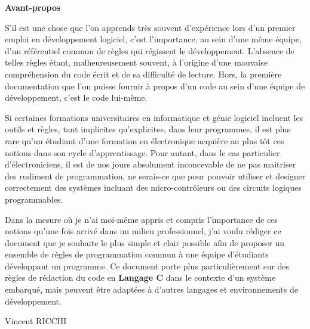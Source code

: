 \thispagestyle{empty}

\begin{Huge}
\textbf{Avant-propos}
\end{Huge}
\bigskip

S'il est une chose que l'on apprends très souvent d'expérience lors d'un premier emploi en développement logiciel, c'est l'importance, au sein d'une même équipe, d'un référentiel commun de règles qui régissent le développement. L'absence de telles règles étant, malheureusement souvent, à l'origine d'une mauvaise compréhension du code écrit et de sa difficulté de lecture. Hors, la première documentation que l'on puisse fournir à propos d'un code au sein d'une équipe de développement, c'est le code lui-même.\bigskip

Si certaines formations universitaires en informatique et génie logiciel incluent les outils et règles, tant implicites qu'explicites, dans leur programmes, il est plus rare qu'un étudiant d'une formation en électronique acquière au plus tôt ces notions dans son cycle d'apprentissage. Pour autant, dans le cas particulier d'électroniciens, il est de nos jours absolument inconcevable de ne pas maitriser des rudiment de programmation, ne serais-ce que pour pouvoir utiliser et designer correctement des systèmes incluant des micro-contrôleurs ou des circuits logiques programmables.\bigskip

Dans la mesure où je n'ai moi-même appris et compris l'importance de ces notions qu'une fois arrivé dans un milieu professionnel, j'ai voulu rédiger ce document que je souhaite le plus simple et clair possible afin de proposer un ensemble de règles de programmation commun à une équipe d'étudiants développant un programme. Ce document porte plus particulièrement sur des règles de rédaction du code en \textbf{Langage C} dans le contexte d'un système embarqué, mais peuvent être adaptées à d'autres langages et environnements de développement.\bigskip

\begin{flushright}
Vincent RICCHI
\end{flushright}

\pagebreak